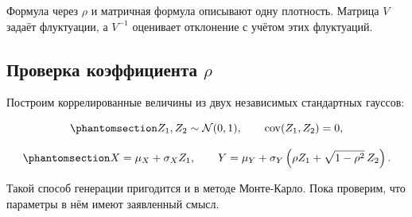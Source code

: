 \documentclass[
  russian,
  11pt,
  a4paper,
  open=any]{scrbook}
\begin{document}
Формула через \(\rho\) и матричная формула описывают одну плотность.
Матрица \(V\) задаёт флуктуации, а \(V^{-1}\) оценивает отклонение с
учётом этих флуктуаций.

\subsection{\texorpdfstring{Проверка коэффициента
\(\rho\)}{Проверка коэффициента \textbackslash rho}}\label{ux43fux440ux43eux432ux435ux440ux43aux430-ux43aux43eux44dux444ux444ux438ux446ux438ux435ux43dux442ux430-rho}

Построим коррелированные величины из двух независимых стандартных
гауссов:

\begin{equation}\protect\phantomsection\label{eq-ch7-independent-standard-normals}{
Z_1,Z_2\sim\mathcal N(0,1),
\qquad
\operatorname{cov}(Z_1,Z_2)=0,
}\end{equation}

\begin{equation}\protect\phantomsection\label{eq-ch7-correlated-construction}{
X=\mu_X+\sigma_XZ_1,
\qquad
Y=\mu_Y+\sigma_Y
\left(\rho Z_1+\sqrt{1-\rho^2}\,Z_2\right).
}\end{equation}

Такой способ генерации пригодится и в методе Монте-Карло. Пока проверим,
что параметры в нём имеют заявленный смысл.
\end{document}
